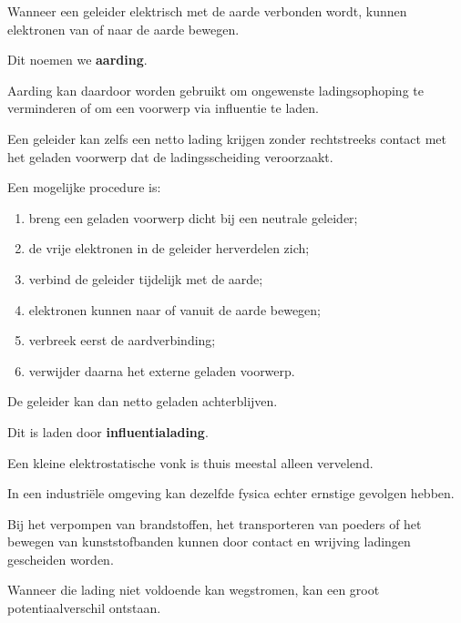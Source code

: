 \documentclass{ximera}
\begin{document}
Wanneer een geleider elektrisch met de aarde verbonden wordt, kunnen
elektronen van of naar de aarde bewegen.

Dit noemen we \textbf{aarding}.

Aarding kan daardoor worden gebruikt om ongewenste ladingsophoping te
verminderen of om een voorwerp via influentie te laden.




Een geleider kan zelfs een netto lading krijgen zonder rechtstreeks
contact met het geladen voorwerp dat de ladingsscheiding veroorzaakt.

Een mogelijke procedure is:

\begin{enumerate}
  \item breng een geladen voorwerp dicht bij een neutrale geleider;
  \item de vrije elektronen in de geleider herverdelen zich;
  \item verbind de geleider tijdelijk met de aarde;
  \item elektronen kunnen naar of vanuit de aarde bewegen;
  \item verbreek eerst de aardverbinding;
  \item verwijder daarna het externe geladen voorwerp.
\end{enumerate}

De geleider kan dan netto geladen achterblijven.

Dit is laden door \textbf{influentialading}.




Een kleine elektrostatische vonk is thuis meestal alleen vervelend.

In een industriële omgeving kan dezelfde fysica echter ernstige
gevolgen hebben.

Bij het verpompen van brandstoffen, het transporteren van poeders of
het bewegen van kunststofbanden kunnen door contact en wrijving
ladingen gescheiden worden.

Wanneer die lading niet voldoende kan wegstromen, kan een groot
potentiaalverschil ontstaan.
\end{document}
